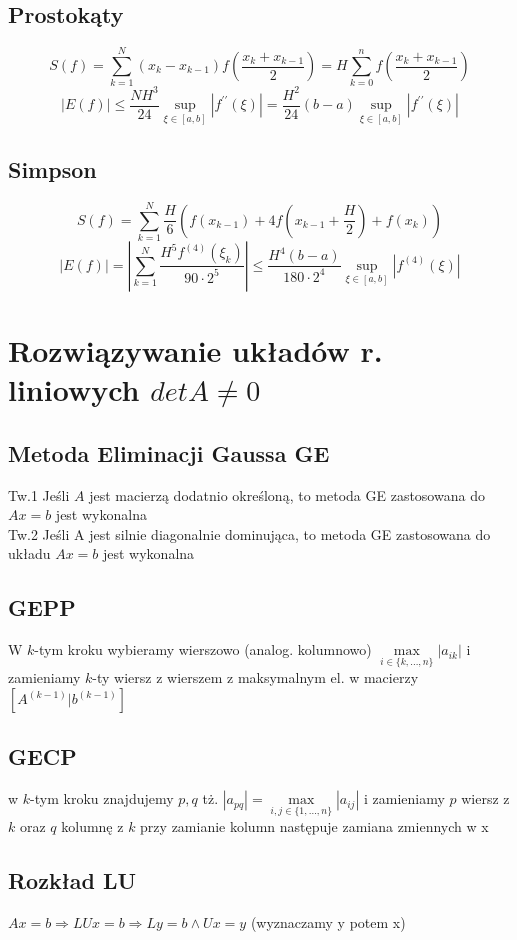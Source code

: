 \documentclass[twocolumn]{article}
\begin{document}
\begin{flushleft}
\subsection{Prostokąty}
$$S(f) = \sum_{k=1}^{N}(x_k - x_{k-1})f\left(\frac{x_k + x_{k-1}}{2}\right) = H\sum_{k=0}^{n}f\left(\frac{x_k + x_{k-1}}{2}\right)$$
$$|E(f)| \leq \frac{NH^3}{24}\underset{\xi \in [a,b]}{\sup}|f^{\prime\prime}(\xi)| = \frac{H^2}{24}(b-a)\underset{\xi \in [a,b]}{\sup}|f^{\prime\prime}(\xi)|$$
\subsection{Simpson}
$$S(f) = \sum_{k=1}^N \frac{H}{6} \left(f(x_{k-1})+4f\left(x_{k-1} + \frac{H}{2}\right) + f(x_k)\right)$$
$$|E(f)|= \left| \sum_{k=1}^N \frac{H^5f^{(4)}(\xi_k)}{90\cdot2^5}\right| \leq \frac{H^4(b-a)}{180\cdot2^4}\underset{\xi \in [a,b]}{\sup}|f^{(4)}(\xi)| $$

\section{Rozwiązywanie układów r. liniowych $detA\neq0$}
\subsection{Metoda Eliminacji Gaussa GE}
Tw.1 Jeśli $A$ jest macierzą dodatnio określoną, to metoda GE zastosowana do $Ax=b$ jest wykonalna\\
Tw.2 Jeśli A jest silnie diagonalnie dominująca, to metoda GE zastosowana do układu $Ax=b$ jest wykonalna
\subsection{GEPP}
W $k$-tym kroku wybieramy wierszowo (analog. kolumnowo) $\underset{i \in \{k,\ldots,n\}}{\max}|a_{ik}|$ i zamieniamy $k$-ty wiersz z wierszem z maksymalnym el. w macierzy $[A^{(k-1)}|b^{(k-1)}]$
\subsection{GECP}
w $k$-tym kroku znajdujemy $p,q$ tż. $|a_{pq}| = \underset{i,j \in \{1,\ldots,n\}}{\max}|a_{ij}|$ i zamieniamy $p$ wiersz z $k$ oraz $q$ kolumnę z $k$ przy zamianie kolumn następuje zamiana zmiennych w x
\subsection{Rozkład LU} %
$Ax=b \Rightarrow LUx = b \Rightarrow Ly=b \land Ux=y$ (wyznaczamy y potem x)

\end{flushleft}
\end{document}
